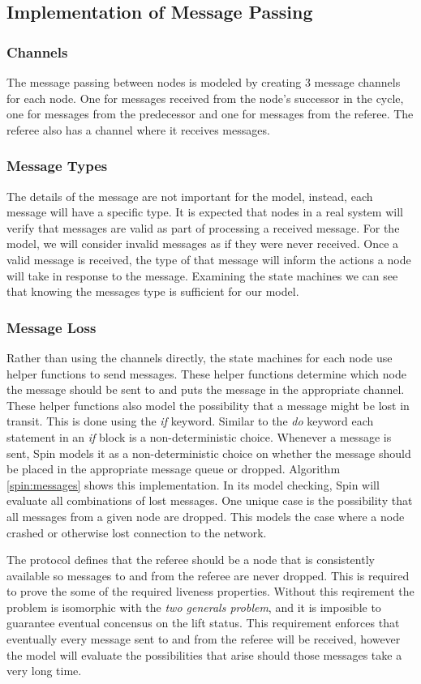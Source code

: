 \documentclass[runningheads]{llncs}
\begin{document}
\subsection{Implementation of Message Passing}
\subsubsection{Channels}
The message passing between nodes is modeled by creating 3 message channels for each node. One for messages received from the node's successor in the cycle, one for messages from the predecessor and one for messages from the referee. The referee also has a channel where it receives messages.
\subsubsection{Message Types}
The details of the message are not important for the model, instead, each message will have a specific type. It is expected that nodes in a real system will verify that messages are valid as part of processing a received message. For the model, we will consider invalid messages as if they were never received. Once a valid message is received, the type of that message will inform the actions a node will take in response to the message. Examining the state machines we can see that knowing the messages type is sufficient for our model. 
\subsubsection{Message Loss}
Rather than using the channels directly, the state machines for each node use helper functions to send messages. These helper functions determine which node the message should be sent to and puts the message in the appropriate channel. These helper functions also model the possibility that a message might be lost in transit. This is done using the \emph{if} keyword. Similar to the \emph{do} keyword each statement in an \emph{if} block is a non-deterministic choice. Whenever a message is sent, Spin models it as a non-deterministic choice on whether the message should be placed in the appropriate message queue or dropped. Algorithm \ref{spin:messages} shows this implementation. In its model checking, Spin will evaluate all combinations of lost messages. One unique case is the possibility that all messages from a given node are dropped. This models the case where a node crashed or otherwise lost connection to the network. 

The protocol defines that the referee should be a node that is consistently available so messages to and from the referee are never dropped. This is required to prove the some of the required liveness properties. Without this reqirement the problem is isomorphic with the \emph{two generals problem}, and it is imposible to guarantee eventual concensus on the lift status. This requirement enforces that eventually every message sent to and from the referee will be received, however the model will evaluate the possibilities that arise should those messages take a very long time. 
\end{document}

